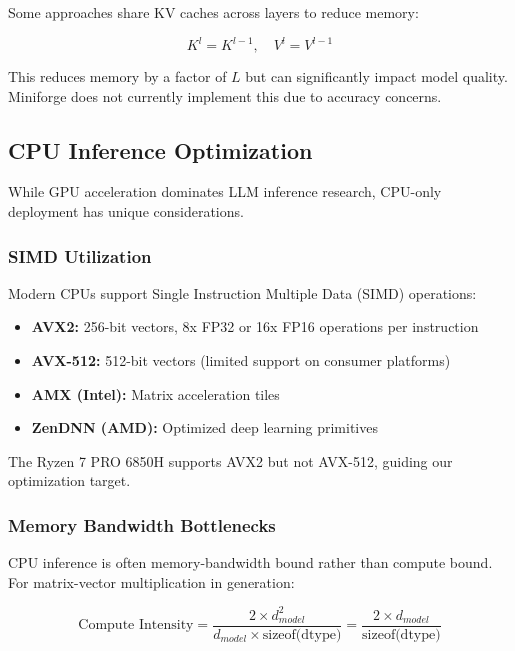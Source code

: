 Some approaches share KV caches across layers to reduce memory:

\begin{equation}
K^l = K^{l-1}, \quad V^l = V^{l-1}
\end{equation}

This reduces memory by a factor of $L$ but can significantly impact model quality. Miniforge does not currently implement this due to accuracy concerns.

\subsection{CPU Inference Optimization}

While GPU acceleration dominates LLM inference research, CPU-only deployment has unique considerations.

\subsubsection{SIMD Utilization}

Modern CPUs support Single Instruction Multiple Data (SIMD) operations:

\begin{itemize}
    \item \textbf{AVX2:} 256-bit vectors, 8x FP32 or 16x FP16 operations per instruction
    \item \textbf{AVX-512:} 512-bit vectors (limited support on consumer platforms)
    \item \textbf{AMX (Intel):} Matrix acceleration tiles
    \item \textbf{ZenDNN (AMD):} Optimized deep learning primitives
\end{itemize}

The Ryzen 7 PRO 6850H supports AVX2 but not AVX-512, guiding our optimization target.

\subsubsection{Memory Bandwidth Bottlenecks}

CPU inference is often memory-bandwidth bound rather than compute bound. For matrix-vector multiplication in generation:

\begin{equation}
\text{Compute Intensity} = \frac{2 \times d_{model}^2}{d_{model} \times \text{sizeof(dtype)}} = \frac{2 \times d_{model}}{\text{sizeof(dtype)}}
\end{equation}


